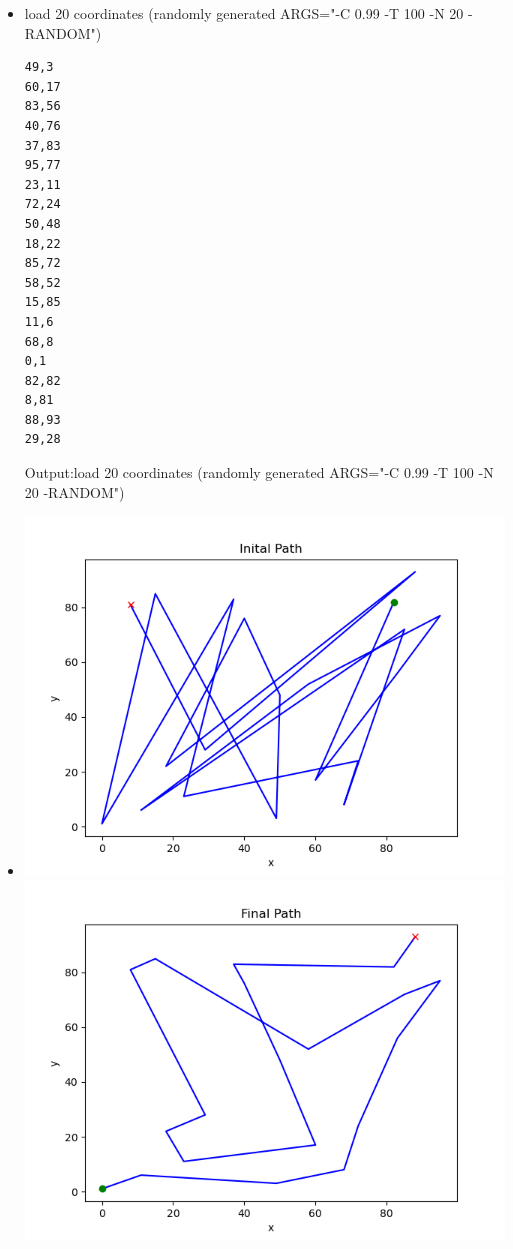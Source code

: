 \documentclass[a4paper,10pt]{article}
\begin{document}
\begin{itemize}
\item load 20 coordinates (randomly 
generated ARGS="-C 0.99 -T 100 -N 20 -RANDOM")
\begin{lstlisting}[style = stdio]
49,3
60,17
83,56
40,76
37,83
95,77
23,11
72,24
50,48
18,22
85,72
58,52
15,85
11,6
68,8
0,1
82,82
8,81
88,93
29,28
\end{lstlisting}

Output:load 20 coordinates (randomly 
generated ARGS="-C 0.99 -T 100 -N 20 -RANDOM")

\item \includegraphics[scale=0.5]{latexGraphs/2_inital_path.png}
\includegraphics[scale=0.5]{latexGraphs/2_final_path.png}

\end{itemize}
\end{document}
